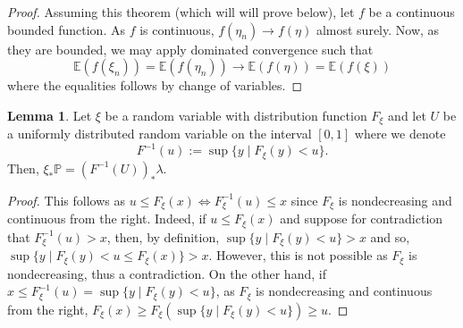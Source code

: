 \documentclass[]{article}
\theoremstyle{definition}
\theoremstyle{definition}
\newtheorem{lemma}{Lemma}[section]
\begin{document}
\begin{proof}
  Assuming this theorem (which will will prove below), 
  let \(f\) be a continuous bounded function. As 
  \(f\) is continuous, \(f(\eta_n) \to f(\eta)\) almost surely. Now, as 
  they are bounded, we may apply dominated convergence such that 
  \[\mathbb{E}(f(\xi_n)) = \mathbb{E}(f(\eta_n)) \to \mathbb{E}(f(\eta)) = \mathbb{E}(f(\xi))\]
  where the equalities follows by change of variables.
\end{proof}

\begin{lemma}
  Let \(\xi\) be a random variable with distribution function \(F_\xi\) and let 
  \(U\) be a uniformly distributed random variable on the interval \([0, 1]\) 
  where we denote 
  \[F^{-1}(u) := \sup \{y \mid F_\xi(y) < u\}.\]
  Then, \(\xi_* \mathbb{P} = (F^{-1}(U))_* \lambda\).
\end{lemma}
\begin{proof}
  This follows as \(u \le F_\xi(x) \iff F_\xi^{-1}(u) \le x\) since \(F_\xi\) 
  is nondecreasing and continuous from the right. Indeed, 
  if \(u \le F_\xi(x)\) and suppose for contradiction that \(F_\xi^{-1}(u) > x\),
  then, by definition, \(\sup \{y \mid F_\xi(y) < u\} > x\) and so, 
  \(\sup \{y \mid F_\xi(y) < u \le F_\xi(x)\} > x\). However, this is not possible 
  as \(F_\xi\) is nondecreasing, thus a contradiction.
  On the other hand, if \(x \le F_\xi^{-1}(u) = \sup \{y \mid F_\xi(y) < u\}\), 
  as \(F_\xi\) is nondecreasing and continuous from the right, 
  \(F_\xi(x) \ge F_\xi(\sup \{y \mid F_\xi(y) < u\}) \ge u\).
\end{proof}
\end{document}
